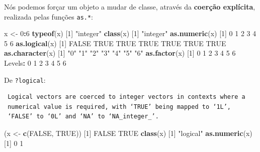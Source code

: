 \documentclass[10pt,a4paper]{book}
\newenvironment{Shaded}{\begin{snugshade}}{\end{snugshade}}
\newcommand{\KeywordTok}[1]{\textcolor[rgb]{0.13,0.29,0.53}{\textbf{#1}}}
\newcommand{\DecValTok}[1]{\textcolor[rgb]{0.00,0.00,0.81}{#1}}
\newcommand{\StringTok}[1]{\textcolor[rgb]{0.31,0.60,0.02}{#1}}
\newcommand{\OtherTok}[1]{\textcolor[rgb]{0.56,0.35,0.01}{#1}}
\newcommand{\OperatorTok}[1]{\textcolor[rgb]{0.81,0.36,0.00}{\textbf{#1}}}
\newcommand{\NormalTok}[1]{#1}
\begin{document}
Nós podemos forçar um objeto a mudar de classe, através da
\textbf{coerção explícita}, realizada pelas funções \texttt{as.*}:

\begin{Shaded}
\begin{Highlighting}[]
\NormalTok{x <-}\StringTok{ }\DecValTok{0}\OperatorTok{:}\DecValTok{6}
\KeywordTok{typeof}\NormalTok{(x)}
\NormalTok{[}\DecValTok{1}\NormalTok{] }\StringTok{"integer"}
\KeywordTok{class}\NormalTok{(x)}
\NormalTok{[}\DecValTok{1}\NormalTok{] }\StringTok{"integer"}
\KeywordTok{as.numeric}\NormalTok{(x)}
\NormalTok{[}\DecValTok{1}\NormalTok{] }\DecValTok{0} \DecValTok{1} \DecValTok{2} \DecValTok{3} \DecValTok{4} \DecValTok{5} \DecValTok{6}
\KeywordTok{as.logical}\NormalTok{(x)}
\NormalTok{[}\DecValTok{1}\NormalTok{] }\OtherTok{FALSE}  \OtherTok{TRUE}  \OtherTok{TRUE}  \OtherTok{TRUE}  \OtherTok{TRUE}  \OtherTok{TRUE}  \OtherTok{TRUE}
\KeywordTok{as.character}\NormalTok{(x)}
\NormalTok{[}\DecValTok{1}\NormalTok{] }\StringTok{"0"} \StringTok{"1"} \StringTok{"2"} \StringTok{"3"} \StringTok{"4"} \StringTok{"5"} \StringTok{"6"}
\KeywordTok{as.factor}\NormalTok{(x)}
\NormalTok{[}\DecValTok{1}\NormalTok{] }\DecValTok{0} \DecValTok{1} \DecValTok{2} \DecValTok{3} \DecValTok{4} \DecValTok{5} \DecValTok{6}
\NormalTok{Levels}\OperatorTok{:}\StringTok{ }\DecValTok{0} \DecValTok{1} \DecValTok{2} \DecValTok{3} \DecValTok{4} \DecValTok{5} \DecValTok{6}
\end{Highlighting}
\end{Shaded}

De \texttt{?logical}:

\begin{verbatim}
 Logical vectors are coerced to integer vectors in contexts where a
 numerical value is required, with ‘TRUE’ being mapped to ‘1L’,
 ‘FALSE’ to ‘0L’ and ‘NA’ to ‘NA_integer_’.
\end{verbatim}

\begin{Shaded}
\begin{Highlighting}[]
\NormalTok{(x <-}\StringTok{ }\KeywordTok{c}\NormalTok{(}\OtherTok{FALSE}\NormalTok{, }\OtherTok{TRUE}\NormalTok{))}
\NormalTok{[}\DecValTok{1}\NormalTok{] }\OtherTok{FALSE}  \OtherTok{TRUE}
\KeywordTok{class}\NormalTok{(x)}
\NormalTok{[}\DecValTok{1}\NormalTok{] }\StringTok{"logical"}
\KeywordTok{as.numeric}\NormalTok{(x)}
\NormalTok{[}\DecValTok{1}\NormalTok{] }\DecValTok{0} \DecValTok{1}
\end{Highlighting}
\end{Shaded}
\end{document}
